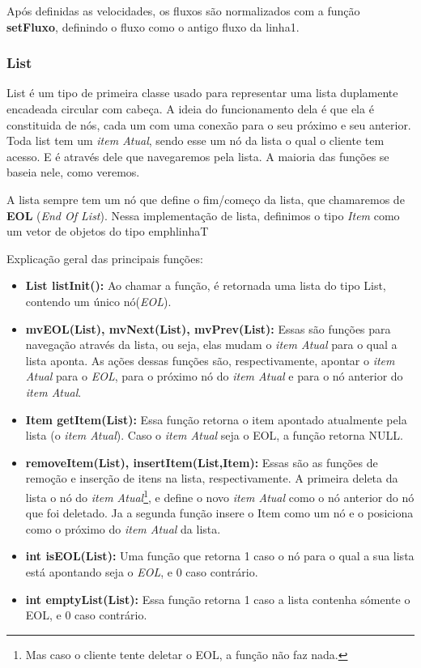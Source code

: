 \documentclass[11pt]{article}
\begin{document}
Após definidas as velocidades, os fluxos são normalizados com a função \textbf{setFluxo}, definindo o fluxo como o antigo fluxo da linha1.

\subsubsection{List}

List é um tipo de primeira classe usado para representar uma lista duplamente encadeada circular com cabeça. A ideia do funcionamento dela é que ela é constituida de nós, cada um com uma conexão para o seu próximo e seu anterior. Toda list tem um \emph{item Atual}, sendo esse um nó da lista o qual o cliente tem acesso. E é através dele que navegaremos pela lista. A maioria das funções se baseia nele, como veremos.

	A lista sempre tem um nó que define o fim/começo da lista, que chamaremos de \textbf{EOL} (\emph{End Of List}). Nessa implementação de lista, definimos o tipo \emph{Item} como um vetor de objetos do tipo emph{linhaT}
	
	Explicação geral das principais funções:
	
\begin{itemize}
	\item \textbf{List listInit():} Ao chamar a função, é retornada uma lista do tipo List, contendo um único nó(\emph{EOL}).
	
	\item \textbf{mvEOL({\color{red}List}), mvNext({\color{red}List}), mvPrev({\color{red}List}):} Essas são funções para navegação através da lista, ou seja, elas mudam o \emph{item Atual} para o qual a lista aponta. As ações dessas funções são, respectivamente, apontar o \emph{item Atual} para o \emph{EOL}, para o próximo nó do \emph{item Atual} e para o nó anterior do \emph{item Atual}.
	
	\item \textbf{Item getItem({\color{red}List}):} Essa função retorna o item apontado atualmente pela lista (o \emph{item Atual}). Caso o \emph{item Atual} seja o EOL, a função retorna {\color{red}NULL}.
	
	\item \textbf{removeItem({\color{red}List}), insertItem({\color{red}List},{\color{red}Item}):} Essas são as funções de remoção e inserção de itens na lista, respectivamente. A primeira deleta da lista o nó do \emph{item Atual}\footnote{Mas caso o cliente tente deletar o EOL, a função não faz nada.}, e define o novo \emph{item Atual} como o nó anterior do nó que foi deletado. Ja a segunda função insere o Item como um nó e o posiciona como o próximo do \emph{item Atual} da lista.
	
	\item \textbf{int isEOL({\color{red}List}):} Uma função que retorna 1 caso o nó para o qual a sua lista está apontando seja o \emph{EOL}, e 0 caso contrário.
	
	\item \textbf{int emptyList({\color{red}List}):} Essa função retorna 1 caso a lista contenha sómente o EOL, e 0 caso contrário.
	
\end{itemize}
\end{document}
